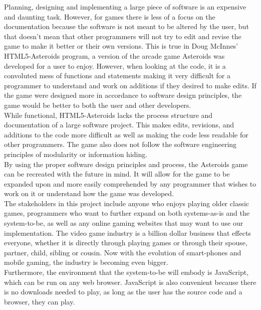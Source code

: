 \documentclass{article}
\begin{document}
Planning, designing and implementing a large piece of software is an expensive and daunting task. However, for games there is less of a focus on the documentation because the software is not meant to be altered by the user, but that doesn't mean that other programmers will not try to edit and revise the game to make it better or their own versions. This is true in Doug McInnes' HTML5-Asteroids program, a version of the arcade game Asteroids was developed for a user to enjoy. However, when looking at the code, it is a convoluted mess of functions and statements making it very difficult for a programmer to understand and work on additions if they desired to make edits. If the game were designed more in accordance to software design principles, the game would be better to both the user and other developers.\\
While functional, HTML5-Asteroids lacks the process structure and documentation of a large software project. This makes edits, revisions, and additions to the code more difficult as well as making the code less readable for other programmers. The game also does not follow the software engineering principles of modularity or information hiding.\\
By using the proper software design principles and process, the Asteroids game can be recreated with the future in mind. It will allow for the game to be expanded upon and more easily comprehended by any programmer that wishes to work on it or understand how the game was developed.\\
The stakeholders in this project include anyone who enjoys playing older classic games, programmers who want to further expand on both systems-as-is and the system-to-be, as well as any online gaming websites that may want to use our implementation. The video game industry is a billion dollar business that effects everyone, whether it is directly through playing games or through their spouse, partner, child, sibling or cousin. Now with the evolution of smart-phones and mobile gaming, the industry is becoming even bigger.\\
Furthermore, the environment that the system-to-be will embody is JavaScript, which can be run on any web browser. JavaScript is also convenient because there is no downloads needed to play, as long as the user has the source code and a browser, they can play.\\





\end{document}
